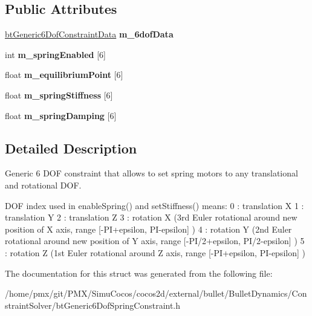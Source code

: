 \subsection*{Public Attributes}
\begin{DoxyCompactItemize}
\item 
\mbox{\label{structbtGeneric6DofSpringConstraintData_a033219c3bd37c0dad9609f23c12ebb69}} 
\hyperlink{structbtGeneric6DofConstraintData}{bt\+Generic6\+Dof\+Constraint\+Data} {\bfseries m\+\_\+6dof\+Data}
\item 
\mbox{\label{structbtGeneric6DofSpringConstraintData_a3f023986635f589af9ed1cda168adda8}} 
int {\bfseries m\+\_\+spring\+Enabled} \mbox{[}6\mbox{]}
\item 
\mbox{\label{structbtGeneric6DofSpringConstraintData_aa0515b478e511ae2bf3a565ce0b5b4a5}} 
float {\bfseries m\+\_\+equilibrium\+Point} \mbox{[}6\mbox{]}
\item 
\mbox{\label{structbtGeneric6DofSpringConstraintData_af5e4b940662431f2cbd72f196ed4721e}} 
float {\bfseries m\+\_\+spring\+Stiffness} \mbox{[}6\mbox{]}
\item 
\mbox{\label{structbtGeneric6DofSpringConstraintData_a57c04b85b5eb6f9909ae93cfa855f3ad}} 
float {\bfseries m\+\_\+spring\+Damping} \mbox{[}6\mbox{]}
\end{DoxyCompactItemize}


\subsection{Detailed Description}
Generic 6 D\+OF constraint that allows to set spring motors to any translational and rotational D\+OF. 

D\+OF index used in enable\+Spring() and set\+Stiffness() means\+: 0 \+: translation X 1 \+: translation Y 2 \+: translation Z 3 \+: rotation X (3rd Euler rotational around new position of X axis, range \mbox{[}-\/\+P\+I+epsilon, P\+I-\/epsilon\mbox{]} ) 4 \+: rotation Y (2nd Euler rotational around new position of Y axis, range \mbox{[}-\/\+P\+I/2+epsilon, P\+I/2-\/epsilon\mbox{]} ) 5 \+: rotation Z (1st Euler rotational around Z axis, range \mbox{[}-\/\+P\+I+epsilon, P\+I-\/epsilon\mbox{]} ) 

The documentation for this struct was generated from the following file\+:\begin{DoxyCompactItemize}
\item 
/home/pmx/git/\+P\+M\+X/\+Simu\+Cocos/cocos2d/external/bullet/\+Bullet\+Dynamics/\+Constraint\+Solver/bt\+Generic6\+Dof\+Spring\+Constraint.\+h\end{DoxyCompactItemize}
